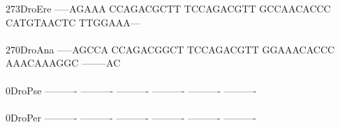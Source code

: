 \documentclass[11pt,twoside,reqno,a4paper]{article}
\begin{document}
{273\hspace*{2\charwidth}DroEre	-----AGAAA	CCAGACGCTT	TCCAGACGTT	GCCAACACCC	CATGTAACTC	TTGGAAA---	\\
\hspace*{5\charwidth}\hspace*{7\charwidth}\hspace*{1\charwidth}\hspace*{1\charwidth}\hspace*{1\charwidth}\hspace*{1\charwidth}\hspace*{1\charwidth}\hspace*{1\charwidth}\\
270\hspace*{2\charwidth}DroAna	-----AGCCA	CCAGACGGCT	TCCAGACGTT	GGAAACACCC	AAACAAAGGC	--------AC	\\
\hspace*{5\charwidth}\hspace*{7\charwidth}\hspace*{1\charwidth}\hspace*{1\charwidth}\hspace*{1\charwidth}\hspace*{1\charwidth}\hspace*{1\charwidth}\hspace*{1\charwidth}\\
0\hspace*{4\charwidth}DroPse	----------	----------	----------	----------	----------	----------	\\
\hspace*{5\charwidth}\hspace*{7\charwidth}\hspace*{1\charwidth}\hspace*{1\charwidth}\hspace*{1\charwidth}\hspace*{1\charwidth}\hspace*{1\charwidth}\hspace*{1\charwidth}\\
0\hspace*{4\charwidth}DroPer	----------	----------	----------	----------	----------	----------	\\
\hspace*{5\charwidth}\hspace*{7\charwidth}\hspace*{1\charwidth}\hspace*{1\charwidth}\hspace*{1\charwidth}\hspace*{1\charwidth}\hspace*{1\charwidth}\hspace*{1\charwidth}\\
}
\end{document}
